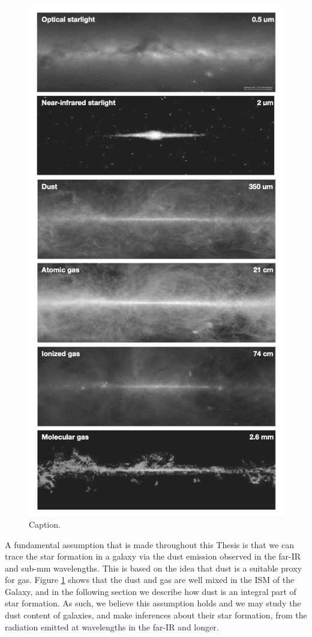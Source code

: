 \begin{figure}
    \centering
	\includegraphics[width=0.75\columnwidth]{Figures/interstellar_medium.png}
	\caption{{\color{red}Caption.} \citealt{Williams_2021}}
	\label{fig:interstellar_medium}
\end{figure}

A fundamental assumption that is made throughout this Thesis is that we can trace the star formation in a galaxy via the dust emission observed in the far-IR and sub-mm wavelengths. This is based on the idea that dust is a suitable proxy for gas. Figure \ref{fig:interstellar_medium} shows that the dust and gas are well mixed in the ISM of the Galaxy, and in the following section we describe how dust is an integral part of star formation. As such, we believe this assumption holds and we may study the dust content of galaxies, and make inferences about their star formation, from the radiation emitted at wavelengths in the far-IR and longer.

